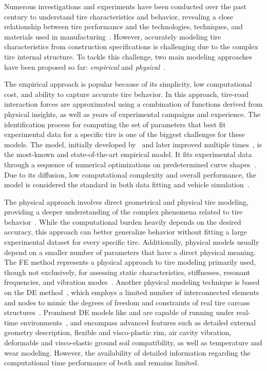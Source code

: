 Numerous investigations and experiments have been conducted over the past century to understand tire characteristics and behavior, revealing a close relationship between tire performance and the technologies, techniques, and materials used in manufacturing~\cite{nakajima2019advanced, gil2020inplane}. However, accurately modeling tire characteristics from construction specifications is challenging due to the complex tire internal structure. To tackle this challenge, two main modeling approaches have been proposed so far: \emph{empirical} and \emph{physical}~\cite{guiggiani2014science, rill2020road, pacejka2012tire, oertel2015years}.

The empirical approach is popular because of its simplicity, low computational cost, and ability to capture accurate tire behavior. In this approach, tire-road interaction forces are approximated using a combination of functions derived from physical insights, as well as years of experimental campaigns and experience. The identification process for computing the set of parameters that best fit experimental data for a specific tire is one of the biggest challenges for these models. The \MagicFormulae{} model, initially developed by~\citet{bakker1987tyre} and later improved multiple times~\cite{pacejka2012tire}, is the most-known and state-of-the-art empirical model. It fits experimental data through a sequence of numerical optimizations on predetermined curve shapes~\cite{bayle1993new}. Due to its diffusion, low computational complexity and overall performance, the \MagicFormulae{} model is considered the standard in both data fitting and vehicle simulation~\cite{guiggiani2014science, pacejka2012tire}.

The physical approach involves direct geometrical and physical tire modeling, providing a deeper understanding of the complex phenomena related to tire behavior~\cite{nakajima2019advanced}. While the computational burden heavily depends on the desired accuracy, this approach can better generalize behavior without fitting a large experimental dataset for every specific tire. Additionally, physical models usually depend on a smaller number of parameters that have a direct physical meaning. The \ac{FE} method represents a physical approach to tire modeling primarily used, though not exclusively, for assessing static characteristics, stiffnesses, resonant frequencies, and vibration modes~\cite{taheri2014technical}. Another physical modeling technique is based on the \ac{DE} method~\cite{karpman2020discrete}, which employs a limited number of interconnected elements and nodes to mimic the degrees of freedom and constraints of real tire carcass structures~\cite{gipser2005ftire, gallrein2007cdtire, yamashita2016physicsbased}. Prominent \ac{DE} models like \FTire{} and \CDTire{} are capable of running under real-time environments~\cite{cosinscientific, gallrein2014advanced}, and encompass advanced features such as detailed external geometry description, flexible and visco-plastic rim, air cavity vibration, deformable and visco-elastic ground soil compatibility, as well as temperature and wear modeling. However, the availability of detailed information regarding the computational time performance of both \FTire{} and \CDTire{} remains limited.

